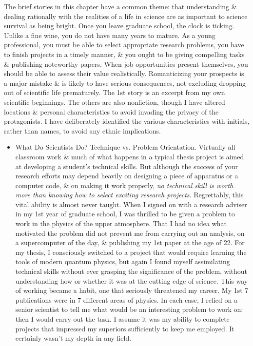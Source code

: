 \documentclass{article}
\begin{document}
\begin{enumerate}
\begin{itemize}
		The brief stories in this chapter have a common theme: that understanding \& dealing rationally with the realities of a life in science are as important to science survival as being bright. Once you leave graduate school, the clock is ticking. Unlike a fine wine, you do not have many years to mature. As a young professional, you must be able to select appropriate research problems, you have to finish projects in a timely manner, \& you ought to be giving compelling tasks \& publishing noteworthy papers. When job opportunities present themselves, you should be able to assess their value realistically. Romanticizing your prospects is a major mistake \& is likely to have serious consequences, not excluding dropping out of scientific life prematurely. The 1st story is an excerpt from my own scientific beginnings. The others are also nonfiction, though I have altered locations \& personal characteristics to avoid invading the privacy of the protagonists. I have deliberately identified the various characteristics with initials, rather than names, to avoid any ethnic implications.
		\begin{itemize}
			\item {\sf What Do Scientists Do? Technique vs. Problem Orientation.} Virtually all classroom work \& much of what happens in a typical thesis project is aimed at developing a student's technical skills. But although the success of your research efforts may depend heavily on designing a piece of apparatus or a computer code, \& on making it work properly, {\it no technical skill is worth more than knowing how to select exciting research projects}. Regrettably, this vital ability is almost never taught. When I signed on with a research adviser in my 1st year of graduate school, I was thrilled to be given a problem to work in the physics of the upper atmosphere. That I had no idea what motivated the problem did not prevent me from carrying out an analysis, on a supercomputer of the day, \& publishing my 1st paper at the age of 22. For my thesis, I consciously switched to a project that would require learning the tools of modern quantum physics, but again I found myself assimilating technical skills without ever grasping the significance of the problem, without understanding how or whether it was at the cutting edge of science. This way of working became a habit, one that seriously threatened my career. My 1st 7 publications were in 7 different areas of physics. In each case, I relied on a senior scientist to tell me what would be an interesting problem to work on; then I would carry out the task. I assume it was my ability to complete projects that impressed my superiors sufficiently to keep me employed. It certainly wasn't my depth in any field.
			

\end{itemize}
\end{itemize}
\end{enumerate}
\end{document}
